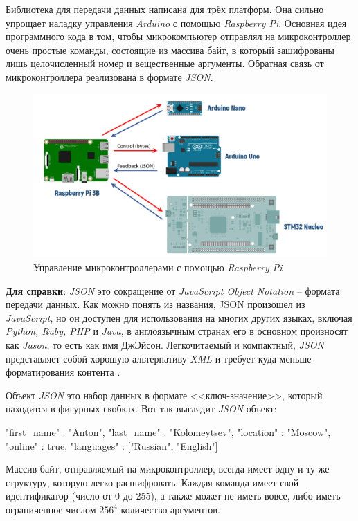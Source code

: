 \noindent Библиотека для передачи данных написана для трёх платформ. Она сильно упрощает наладку управления \textit{Arduino} с помощью \textit{Raspberry Pi}. Основная идея программного кода в том, чтобы микрокомпьютер отправлял на микроконтроллер очень простые команды, состоящие из массива байт, в который зашифрованы лишь целочисленный номер и вещественные аргументы. Обратная связь от микроконтроллера реализована в формате \textit{JSON}.

\begin{figure}[h]
    \centering
    \includegraphics[scale=0.6]{chapter_arch/figure1.png}
    \caption{Управление микроконтроллерами с помощью \textit{Raspberry Pi}}
    \label{}
\end{figure}

\textbf{Для справки}: \textit{JSON} это сокращение от \textit{JavaScript Object Notation} -- формата передачи данных. Как можно понять из названия, {JSON} произошел из \textit{JavaScript}, но он доступен для использования на многих других языках, включая \textit{Python, Ruby, PHP} и \textit{Java}, в англоязычным странах его в основном произносят как \textit{Jason}, то есть как имя ДжЭйсон. Легкочитаемый и компактный, \textit{JSON} представляет собой хорошую альтернативу \textit{XML} и требует куда меньше форматирования контента \cite{Jayson2018}.

\noindent Объект \textit{JSON} это набор данных в формате <<ключ-значение>>, который находится в фигурных скобках.
Вот так выглядит \textit{JSON} объект:
\begin{code}
{
  "first_name" : "Anton",
  "last_name" : "Kolomeytsev",
  "location" : "Moscow",
  "online" : true,
  "languages" : ["Russian", "English"] 
}
\end{code}

Массив байт, отправляемый на микроконтроллер, всегда имеет одну и ту же структуру, которую легко расшифровать. Каждая команда имеет свой идентификатор (число от 0 до 255), а также может не иметь вовсе, либо иметь ограниченное числом $ 256^4 $ количество аргументов. 

